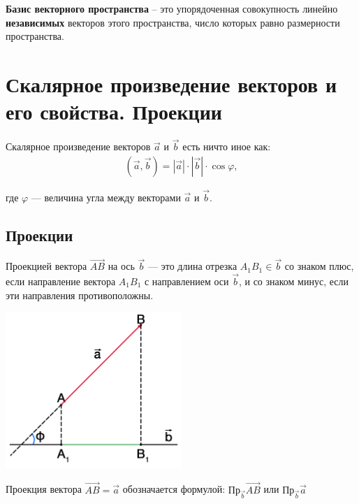 \documentclass[a4paper,12pt]{extbook}
\theoremstyle{named}
\theoremstyle{named}
\begin{document}
\textbf{Базис векторного пространства} – это упорядоченная совокупность линейно \textbf{независимых} векторов этого пространства, число которых равно размерности пространства.



\section{Скалярное произведение векторов и его свойства. Проекции}\label{sec:scalar-multiply}

Скалярное произведение векторов \(\overrightarrow{a}\) и \(\overrightarrow{b}\) есть ничто иное как:
\begin{gather*}
    (\overrightarrow{a}, \overrightarrow{b}) = |\overrightarrow{a}| \cdot |\overrightarrow{b}| \cdot \cos{\varphi},
\end{gather*}

где \(\varphi\) — величина угла между векторами \(\overrightarrow{a}\) и \(\overrightarrow{b}\).

\subsection*{Проекции}

Проекцией вектора \(\overrightarrow{AB}\) на ось \(\overrightarrow{b}\) — это длина отрезка \(A_1B_1 \in \overrightarrow{b}\) со знаком плюс, если направление вектора \(A_1B_1\) с направлением оси \(\overrightarrow{b}\), и со знаком минус, если эти направления противоположны.

\begin{center}
    \includegraphics[width=0.5\textwidth]{projection.png}
\end{center}

Проекция вектора \(\overrightarrow{AB} = \overrightarrow{a}\) обозначается формулой: \(\text{Пр}_{\overrightarrow{b}}\overrightarrow{AB}\) или \(\text{Пр}_{\overrightarrow{b}}\overrightarrow{a}\)
\end{document}
